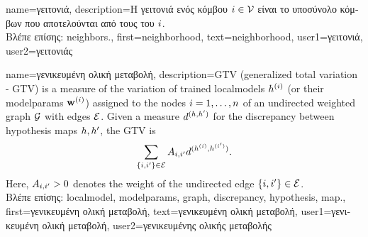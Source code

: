 {name={\foreignlanguage{greek}{γειτονιά}},
	description={\foreignlanguage{greek}{Η γειτονιά ενός κόμβου} 
		$i \in \mathcal{V}$ \foreignlanguage{greek}{είναι το υποσύνολο κόμβων που αποτελούνται από τους} 
		 \foreignlanguage{greek}{του} $i$.\\
		\foreignlanguage{greek}{Βλέπε επίσης:} \gls{neighbors}.},
	first={neighborhood},
	text={neighborhood},
	user1={\foreignlanguage{greek}{γειτονιά}}, %
   	user2={\foreignlanguage{greek}{γειτονιάς}} %
}

{name={\foreignlanguage{greek}{γενικευμένη ολική μεταβολή}}, 
	description={GTV (generalized total variation - GTV) is a 
		measure of the variation of trained \gls{localmodel}s $h^{(i)}$ 
		(or their \gls{modelparams} $\mathbf{w}^{(i)}$) assigned to the nodes $i=1, \ldots, n$ 
		of an undirected weighted \gls{graph} $\mathcal{G}$ with edges $\mathcal{E}$. Given a measure $d^{(h,h')}$ 
		for the \gls{discrepancy} between \gls{hypothesis} \gls{map}s $h,h'$, the GTV is 
		\begin{equation} 
			\nonumber
			\sum_{\{i,i'\}\in \mathcal{E}} A_{i,i'} 
			d^{(h^{(i)},h^{(i')})}.
		\end{equation}
		Here, $A_{i,i'}>0$ denotes the weight of the undirected edge $\{i,i'\}\in \mathcal{E}$.\\
		\foreignlanguage{greek}{Βλέπε επίσης:} \gls{localmodel}, \gls{modelparams}, \gls{graph}, \gls{discrepancy}, \gls{hypothesis}, \gls{map}.},
	first={\foreignlanguage{greek}{γενικευμένη ολική μεταβολή}},
	text={\foreignlanguage{greek}{γενικευμένη ολική μεταβολή}},
	user1={\foreignlanguage{greek}{γενικευμένη ολική μεταβολή}}, %
  	user2={\foreignlanguage{greek}{γενικευμένης ολικής μεταβολής}} %
}

